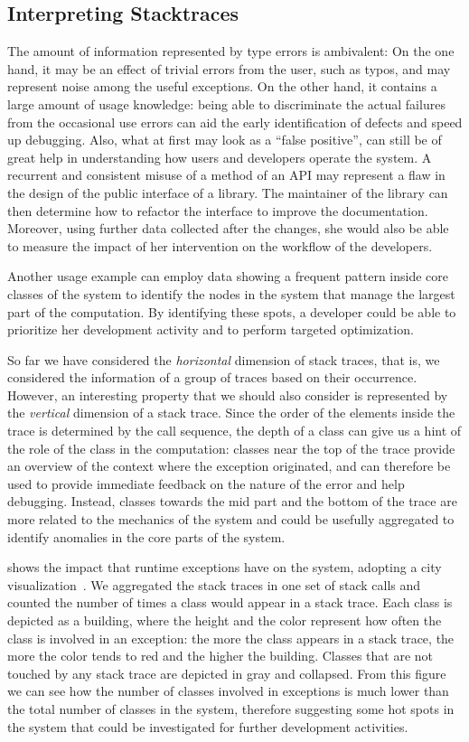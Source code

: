 \subsection{Interpreting Stacktraces}

The amount of information represented by type errors is ambivalent: On the one hand, it may be an effect of trivial errors from the user, such as typos, and may represent noise among the useful exceptions.
On the other hand, it contains a large amount of usage knowledge: being able to discriminate the actual failures from the occasional use errors can aid the early identification of defects and speed up debugging.
Also, what at first may look as a ``false positive'', can still be of great help in understanding how users and developers operate the system.
A recurrent and consistent misuse of a method of an API may represent a flaw in the design of the public interface of a library.
The maintainer of the library can then determine how to refactor the interface to improve the documentation.
Moreover, using further data collected after the changes, she would also be able to measure the impact of her intervention on the workflow of the developers.

Another usage example can employ data showing a frequent pattern inside core classes of the system to identify the nodes in the system that manage the largest part of the computation.
By identifying these spots, a developer could be able to prioritize her development activity and to perform targeted optimization.

So far we have considered the \emph{horizontal} dimension of stack traces, that is, we considered the information of a group of traces based on their occurrence.
However, an interesting property that we should also consider is represented by the \emph{vertical} dimension of a stack trace.
Since the order of the elements inside the trace is determined by the call sequence, the depth of a class can give us a hint of the role of the class in the computation: classes near the top of the trace provide an overview of the context where the exception originated, and can therefore be used to provide immediate feedback on the nature of the error and help debugging.
Instead, classes towards the mid part and the bottom of the trace are more related to the mechanics of the system and could be usefully aggregated to identify anomalies in the core parts of the system.

 shows the impact that runtime exceptions have on the \pha system, adopting a city visualization~\cite{Wett2011a}.
We aggregated the stack traces in one set of stack calls and counted the number of times a class would appear in a stack trace.
Each class is depicted as a building, where the height and the color represent how often the class is involved in an exception: the more the class appears in a stack trace, the more the color tends to red and the higher the building.
Classes that are not touched by any stack trace are depicted in gray and collapsed.
From this figure we can see how the number of classes involved in exceptions is much lower than the total number of classes in the system, therefore suggesting some hot spots in the system that could be investigated for further development activities.

